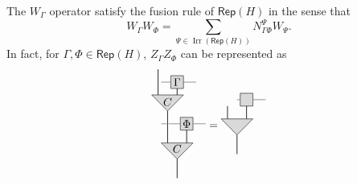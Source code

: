 \documentclass[a4paper,11pt]{article}
\theoremstyle{theorem}
\theoremstyle{remark}
\newcommand{\Rep}{\mathsf{Rep}}
\newcommand{\Irr}{\operatorname{Irr}}
\begin{document}
The $W_{\Gamma}$ operator satisfy the fusion rule of $\Rep(H)$ in the sense that 
\begin{equation}\label{eq:Wgamma}
    W_{\Gamma}W_{\Phi} =\sum_{\Psi\in \Irr(\Rep(H))} N_{\Gamma \Phi}^{\Psi} W_{\Psi}.
\end{equation}
In fact, for $\Gamma,\Phi\in \Rep(H)$, $ Z_{\Gamma}Z_{\Phi}$ can be represented as 
\begin{equation}
   \begin{aligned}
        \begin{tikzpicture}
           \draw[fill=gray!30]  (0,0) -- (1,0) -- (0.5,-0.5) -- cycle;
           \draw[line width=.6pt,black] (0.2,0)--(0.2,1);
           \draw[line width=.6pt,black] (0.8,0)--(0.8,0.6);
           \draw[line width=.6pt,black] (0.5,-0.5)--(0.5,-1.1);
          \draw[black,fill=gray!30] (0.6,.4) rectangle ++(0.4,0.4);   
           \draw[line width=.6pt,black,gray] (1,0.6)--(1.4,0.6);
            \draw[line width=.6pt,black,gray] (0.6,0.6)--(0.23,0.6);
            \draw[line width=.6pt,black,gray] (0,0.6)--(0.17,0.6);
         \draw[fill=gray!30]  (-0.3,1.5) -- (0.7,1.5) -- (0.2,1) -- cycle;
    \draw[line width=.6pt,black] (-0.1,1.5)--(-0.1,2.3);
           \draw[line width=.6pt,black] (0.5,1.5)--(0.5,1.9);
           \draw[black,fill=gray!30] (0.3,1.7) rectangle ++(0.4,0.4); 
          \draw[line width=.6pt,black,gray] (0.7,1.9)--(1.1,1.9);
          \draw[line width=.6pt,black,gray] (0.3,1.9)--(0,1.9);
            \node[ line width=0.6pt, dashed, draw opacity=0.5] (a) at (0.8,0.6){$\Phi$};
            \node[ line width=0.6pt, dashed, draw opacity=0.5] (a) at (0.5,1.9){$\Gamma$};
            \node at (0.5, -.18) {$ C$}; 
                        \node at (0.2, 1.28) {$ C$}; 
        \end{tikzpicture}
    \end{aligned}
    = \begin{aligned}
        \begin{tikzpicture}
           \draw[fill=gray!30]  (0,0) -- (1,0) -- (0.5,-0.5) -- cycle;
           \draw[line width=.6pt,black] (0.2,0)--(0.2,0.4);
           \draw[line width=.6pt,black] (0.8,0)--(0.8,0.6);
           \draw[line width=.6pt,black] (0.5,-0.5)--(0.5,-1.1);
          \draw[black,fill=gray!30] (0.6,.4) rectangle ++(0.4,0.4);   
           \draw[line width=.6pt,black,gray] (1,0.6)--(1.4,0.6);
            \draw[line width=.6pt,black,gray] (0.6,0.6)--(0.5,0.6);

\end{tikzpicture}
\end{aligned}
\end{equation}
\end{document}
